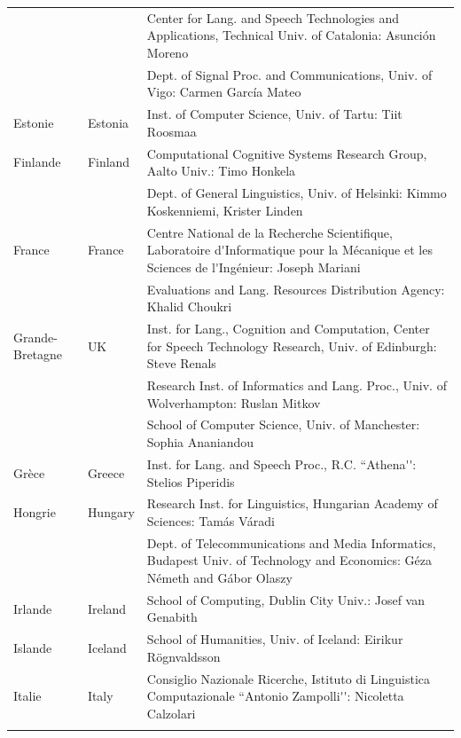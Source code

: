 \documentclass[]{../metanetpaper}
\begin{document}
\begin{longtable}{llp{105mm}}
  & & Center for Lang. and Speech Technologies and Applications, Technical Univ. of Catalonia: Asunción Moreno \\ \addlinespace 
  & & Dept. of Signal Proc. and Communications, Univ. of Vigo: Carmen García Mateo \\ \addlinespace 
  Estonie & \textcolor{grey1}{Estonia} & Inst. of Computer Science, Univ. of Tartu: Tiit Roosmaa\\ \addlinespace
  Finlande & \textcolor{grey1}{Finland} & Computational Cognitive Systems Research Group, Aalto Univ.: Timo Honkela\\ \addlinespace
  & & Dept. of General Linguistics, Univ. of Helsinki: Kimmo Koskenniemi, Krister Linden \\ \addlinespace
  France & \textcolor{grey1}{France} & Centre National de la Recherche Scientifique, Laboratoire d{\mbox '}Informatique pour la Mécanique et les Sciences de l{\mbox '}Ingénieur: Joseph Mariani \\ \addlinespace
  & & Evaluations and Lang. Resources Distribution Agency: Khalid Choukri\\ \addlinespace 
  Grande-Bretagne & \textcolor{grey1}{UK} & Inst. for Lang., Cognition and Computation, Center for Speech Technology Research, Univ. of Edinburgh: Steve Renals \\ \addlinespace 
  & & Research Inst. of Informatics and Lang. Proc., Univ. of Wolverhampton: Ruslan Mitkov \\ \addlinespace 
  & & School of Computer Science, Univ. of Manchester: Sophia Ananiandou \\ \addlinespace 
  Grèce & \textcolor{grey1}{Greece} & Inst. for Lang. and Speech Proc., R.C. ``Athena{\mbox '}{\mbox '}: Stelios Piperidis\\ \addlinespace
  Hongrie & \textcolor{grey1}{Hungary} & Research Inst. for Linguistics, Hungarian Academy of Sciences: Tamás Váradi\\  \addlinespace
  & & Dept. of Telecommunications and Media Informatics, Budapest Univ. of Technology and Economics: Géza Németh and Gábor Olaszy\\ \addlinespace
  Irlande & \textcolor{grey1}{Ireland} & School of Computing, Dublin City Univ.: Josef van Genabith\\ \addlinespace
  Islande & \textcolor{grey1}{Iceland} & School of Humanities, Univ. of Iceland: Eirikur Rögnvaldsson\\ \addlinespace
  Italie & \textcolor{grey1}{Italy} & Consiglio Nazionale Ricerche, Istituto di Linguistica Computazionale ``Antonio Zampolli{\mbox '}{\mbox '}: Nicoletta Calzolari\\ \addlinespace

\end{longtable}
\end{document}
